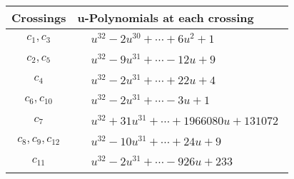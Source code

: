 \documentclass[1p]{elsarticle_modified}
\theoremstyle{definition}
\begin{document}
\begin{tabular}{m{50pt}|m{274pt}}
Crossings & \hspace{64pt}u-Polynomials at each crossing \\
\hline $$\begin{aligned}c_{1},c_{3}\end{aligned}$$&$\begin{aligned}
&u^{32}-2 u^{30}+\cdots+6 u^2+1
\end{aligned}$\\
\hline $$\begin{aligned}c_{2},c_{5}\end{aligned}$$&$\begin{aligned}
&u^{32}-9 u^{31}+\cdots-12 u+9
\end{aligned}$\\
\hline $$\begin{aligned}c_{4}\end{aligned}$$&$\begin{aligned}
&u^{32}-2 u^{31}+\cdots+22 u+4
\end{aligned}$\\
\hline $$\begin{aligned}c_{6},c_{10}\end{aligned}$$&$\begin{aligned}
&u^{32}-2 u^{31}+\cdots-3 u+1
\end{aligned}$\\
\hline $$\begin{aligned}c_{7}\end{aligned}$$&$\begin{aligned}
&u^{32}+31 u^{31}+\cdots+1966080 u+131072
\end{aligned}$\\
\hline $$\begin{aligned}c_{8},c_{9},c_{12}\end{aligned}$$&$\begin{aligned}
&u^{32}-10 u^{31}+\cdots+24 u+9
\end{aligned}$\\
\hline $$\begin{aligned}c_{11}\end{aligned}$$&$\begin{aligned}
&u^{32}-2 u^{31}+\cdots-926 u+233
\end{aligned}$\\
\hline
\end{tabular}\\~\\
\newpage\renewcommand{\arraystretch}{1}
\end{document}
